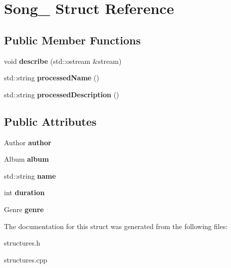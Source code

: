 \hypertarget{struct_song__}{}\section{Song\+\_\+ Struct Reference}
\label{struct_song__}
\subsection*{Public Member Functions}
\begin{DoxyCompactItemize}
\item 
void {\bfseries describe} (std\+::ostream \&stream)\hypertarget{struct_song___a8e10f0e16d2a33ba48b9955af12f9e1b}{}\label{struct_song___a8e10f0e16d2a33ba48b9955af12f9e1b}

\item 
std\+::string {\bfseries processed\+Name} ()\hypertarget{struct_song___a54a55b6d0992acb3d837a4ab3dd39e3a}{}\label{struct_song___a54a55b6d0992acb3d837a4ab3dd39e3a}

\item 
std\+::string {\bfseries processed\+Description} ()\hypertarget{struct_song___a8590717ee470e51084b5962ab31132ed}{}\label{struct_song___a8590717ee470e51084b5962ab31132ed}

\end{DoxyCompactItemize}
\subsection*{Public Attributes}
\begin{DoxyCompactItemize}
\item 
Author {\bfseries author}\hypertarget{struct_song___a22b6bac1012407ac1c4466a92dcc5a02}{}\label{struct_song___a22b6bac1012407ac1c4466a92dcc5a02}

\item 
Album {\bfseries album}\hypertarget{struct_song___a3f2e9d863061c065520c215491272f5e}{}\label{struct_song___a3f2e9d863061c065520c215491272f5e}

\item 
std\+::string {\bfseries name}\hypertarget{struct_song___a741b8c59b73c0569f7596f564d96ce92}{}\label{struct_song___a741b8c59b73c0569f7596f564d96ce92}

\item 
int {\bfseries duration}\hypertarget{struct_song___aa447371b3e9bd8d275d98e152d2e1613}{}\label{struct_song___aa447371b3e9bd8d275d98e152d2e1613}

\item 
Genre {\bfseries genre}\hypertarget{struct_song___a9bc80c8856f1e39234e61517d989a014}{}\label{struct_song___a9bc80c8856f1e39234e61517d989a014}

\end{DoxyCompactItemize}


The documentation for this struct was generated from the following files\+:\begin{DoxyCompactItemize}
\item 
structures.\+h\item 
structures.\+cpp\end{DoxyCompactItemize}
